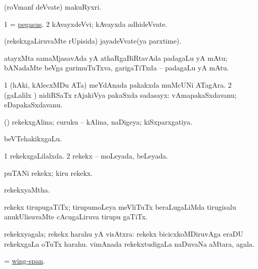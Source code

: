 \bentry
{}
\gl{\nA}
\bmng
(roVmanf deVvate) makuRyxri. 
\emng
\eentry

\bentry 
{}
\gl{\nA}
\bmng
\bnum
\num{1} = \hyperref{kandict_p.pdf}{P}{Pegasus}{pegasus}. 
\num{2} kAvayxdeVvi; kAvayxda adhideVvate. 
\enum
\emng
\eentry

\bentry
{}
\gl{\nA}
\bmng
(rekekxgaLiruvaMte rUpisida) jayadeVvate(ya parxtime). 
\emng
\eentry

\bentry
{}
\gl{\nA}
\bmng
atayxMta samaMjasavAda yA athaRgaBiRtavAda padagaLu yA mAtu; bANadaMte beVga gurimuTuTxva, garigaTiTxda -- padagaLu yA mAtu. 
\emng
\eentry

\bentry
{} 
\gl{\nA}
\expl{}
\bmng
\bnum
\num{1} (hAki, kAlecxMDu ATa) meYdAnada pakakxda muMcUNi ATagAra. 
\num{2} (\saMpa gaLalilx \parx) nidiRSaTx rAjakiVya pakaSxda sadasayx:  vAmapakaSxdavanu; eDapakaSxdavanu. 
\enum
\emng
\eentry

\bentry
{}
\gl{\gu}
\bmng
(\kAparx) rekekxgAlina; curuku -- kAlina, naDigeya; kiSxparxgatiya. 
\emng
\eentry

\bentry
{}
\gl{\nA}
\bmng
beVTehakikxgaLu. 
\emng
\eentry

\bentry
{} 
\gl{\gu}
\expl{}
\bmng
\bnum
\num{1} rekekxgaLilalxda. 
\num{2} rekekx -- moLeyada, beLeyada. 
\enum
\emng
\eentry

\bentry
{}
\gl{\nA}
\bmng
puTANi rekekx; kiru rekekx. 
\emng
\eentry

\bentry
{}
\gl{\gu}
\bmng
rekekxyaMtha. 
\emng
\eentry

\bentry
{}
\gl{\nA}
\bmng
rekekx tirupugaTiTx; tirupumoLeya meVliTuTx beraLugaLiMda tirugisalu anukUlisuvaMte cAcugaLiruva tirupu gaTiTx. 
\emng
\eentry

\bentry
{}
\gl{\nA}
\bmng
rekekxyagala; rekekx harahu yA visAtxra: 
\banum
{} rekekx bicicxkoMDiruvAga eraDU rekekxgaLa oTuTx harahu. 
 vimAnada rekekxtudigaLa naDuvaNa aMtara, agala. 
\eanum
\emng
\eentry

\bentry
{}
\gl{\nA}
\bmng
= \hyperlink{wing-span}{wing-span}. 
\emng
\eentry

